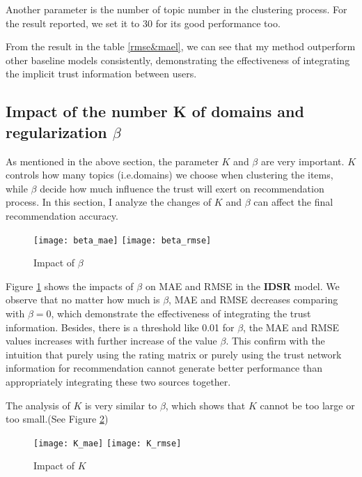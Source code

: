 Another parameter is the number of topic number in the clustering process. For the result reported, we set it to 30 for its good performance too.

From the result in the table \ref{rmse&mael}, we can see that my method outperform other baseline models consistently, demonstrating the effectiveness of integrating the implicit trust information between users.

\subsection{Impact of the number K of domains and regularization $\beta$}
As mentioned in the above section, the parameter $K$ and $\beta$ are very important. $K$ controls how many topics (i.e.domains) we choose when clustering the items, while $\beta$ decide how much influence the trust will exert on recommendation process. In this section, I analyze the changes of $K$ and $\beta$ can affect the final recommendation accuracy.

\begin{figure}[h]
	\caption{Impact of $\beta$}
	\label{fig:beta}
	\texttt{[image: beta\_mae]}
	\texttt{[image: beta\_rmse]}
\end{figure}

Figure \ref{fig:beta} shows the impacts of $\beta$ on MAE and RMSE in the \textbf{IDSR} model. We observe that no matter how much is $\beta$, MAE and RMSE decreases comparing with $\beta = 0$, which demonstrate the effectiveness of integrating the trust information. Besides, there is a threshold like 0.01 for $\beta$, the MAE and RMSE values increases with further increase of the value $\beta$. This confirm with the intuition that purely using the rating matrix or purely using the trust network information for recommendation cannot generate better performance than appropriately integrating these two sources together.

The analysis of $K$ is very similar to $\beta$, which shows that $K$ cannot be too large or too small.(See Figure \ref{fig:k})
\begin{figure}[h]
	\caption{Impact of $K$}
	\label{fig:k}
	\texttt{[image: K\_mae]}
	\texttt{[image: K\_rmse]}
\end{figure}

